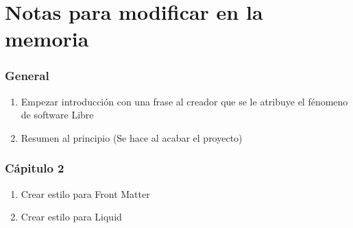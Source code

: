 
\chapter*{Notas para modificar en la memoria}
\subsection*{General}
\begin{enumerate}
    \item Empezar introducción con una frase al creador que se le atribuye el fénomeno de  software Libre
    \item Resumen al principio (Se hace al acabar el proyecto)
\end{enumerate}
\subsection*{Cápitulo 2}
\begin{enumerate}
    \item Crear estilo para Front Matter
    \item Crear estilo para Liquid
\end{enumerate}
